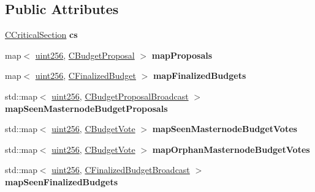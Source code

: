\subsection*{Public Attributes}
\begin{DoxyCompactItemize}
\item 
\mbox{\label{class_c_budget_manager_a67d5cdc1a964de128a2ba4d4b5590ebd}} 
\mbox{\hyperlink{class_annotated_mixin}{C\+Critical\+Section}} {\bfseries cs}
\item 
\mbox{\label{class_c_budget_manager_a25d2d0ede6489ea2069e1089dae39f49}} 
map$<$ \mbox{\hyperlink{classuint256}{uint256}}, \mbox{\hyperlink{class_c_budget_proposal}{C\+Budget\+Proposal}} $>$ {\bfseries map\+Proposals}
\item 
\mbox{\label{class_c_budget_manager_a68738720aa55de4b90fb10fb584547a9}} 
map$<$ \mbox{\hyperlink{classuint256}{uint256}}, \mbox{\hyperlink{class_c_finalized_budget}{C\+Finalized\+Budget}} $>$ {\bfseries map\+Finalized\+Budgets}
\item 
\mbox{\label{class_c_budget_manager_abd6301aa6bea861b0297230745c9e7a2}} 
std\+::map$<$ \mbox{\hyperlink{classuint256}{uint256}}, \mbox{\hyperlink{class_c_budget_proposal_broadcast}{C\+Budget\+Proposal\+Broadcast}} $>$ {\bfseries map\+Seen\+Masternode\+Budget\+Proposals}
\item 
\mbox{\label{class_c_budget_manager_a4bbe0d7ee2834efebbc9ed15adb8b913}} 
std\+::map$<$ \mbox{\hyperlink{classuint256}{uint256}}, \mbox{\hyperlink{class_c_budget_vote}{C\+Budget\+Vote}} $>$ {\bfseries map\+Seen\+Masternode\+Budget\+Votes}
\item 
\mbox{\label{class_c_budget_manager_a61165892ae8f278663ffbb67dbc78fd0}} 
std\+::map$<$ \mbox{\hyperlink{classuint256}{uint256}}, \mbox{\hyperlink{class_c_budget_vote}{C\+Budget\+Vote}} $>$ {\bfseries map\+Orphan\+Masternode\+Budget\+Votes}
\item 
\mbox{\label{class_c_budget_manager_a289e14968fc776b8c0570b03ea8c8ecd}} 
std\+::map$<$ \mbox{\hyperlink{classuint256}{uint256}}, \mbox{\hyperlink{class_c_finalized_budget_broadcast}{C\+Finalized\+Budget\+Broadcast}} $>$ {\bfseries map\+Seen\+Finalized\+Budgets}

\end{DoxyCompactItemize}
